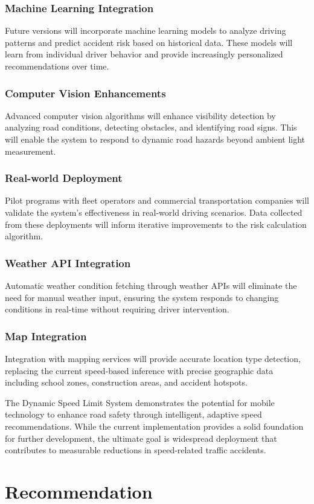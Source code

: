 \subsection{Machine Learning Integration}
Future versions will incorporate machine learning models to analyze driving patterns and predict accident risk based on historical data. These models will learn from individual driver behavior and provide increasingly personalized recommendations over time.

\subsection{Computer Vision Enhancements}
Advanced computer vision algorithms will enhance visibility detection by analyzing road conditions, detecting obstacles, and identifying road signs. This will enable the system to respond to dynamic road hazards beyond ambient light measurement.

\subsection{Real-world Deployment}
Pilot programs with fleet operators and commercial transportation companies will validate the system's effectiveness in real-world driving scenarios. Data collected from these deployments will inform iterative improvements to the risk calculation algorithm.

\subsection{Weather API Integration}
Automatic weather condition fetching through weather APIs will eliminate the need for manual weather input, ensuring the system responds to changing conditions in real-time without requiring driver intervention.

\subsection{Map Integration}
Integration with mapping services will provide accurate location type detection, replacing the current speed-based inference with precise geographic data including school zones, construction areas, and accident hotspots.

The Dynamic Speed Limit System demonstrates the potential for mobile technology to enhance road safety through intelligent, adaptive speed recommendations. While the current implementation provides a solid foundation for further development, the ultimate goal is widespread deployment that contributes to measurable reductions in speed-related traffic accidents.

\chapter{Recommendation}

